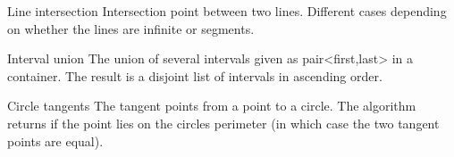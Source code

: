 



\begin{algorithm}{Line intersection}
\desc
Intersection point between two lines.  Different cases depending on
whether the lines are infinite or segments.
\end{algorithm}

\begin{algorithm}{Interval union}
\desc
The union of several intervals given as pair<first,last> in a container. The
result is a disjoint list of intervals in ascending order.
\end{algorithm}


\begin{algorithm}{Circle tangents}
\desc
The tangent points from a point to a circle. The algorithm returns if
the point lies on the circles perimeter (in which case the two tangent
points are equal).
\end{algorithm}




